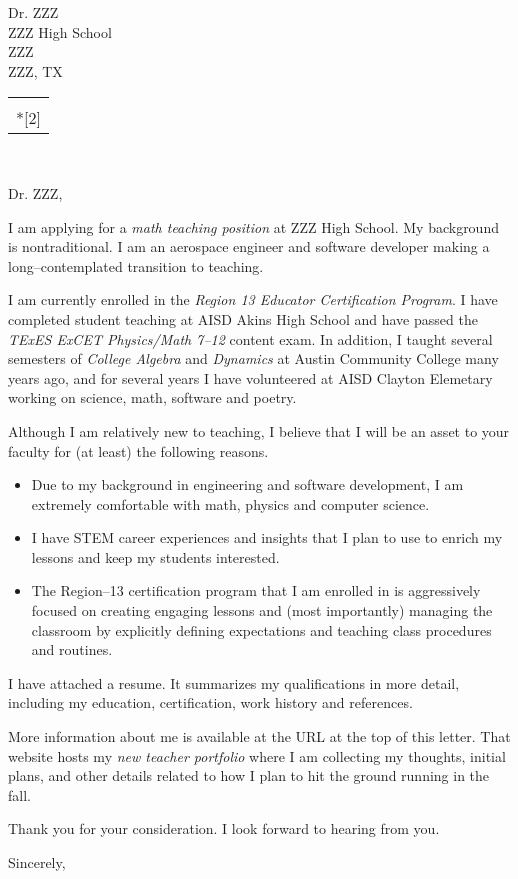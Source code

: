 \documentclass[12pt]{letter}
\makeatletter
\newcommand{\principalname}{Dr. ZZZ}
\newcommand{\schoolname}{ZZZ High School}
\newcommand{\schoolstreetaddress}{ZZZ}
\newcommand{\schoolcitystate}{ZZZ, TX}
\renewcommand*{\opening}[1]{\ifx\@empty\fromaddress
    \thispagestyle{firstpage}%
      {\raggedleft\@date\par}%
    \else  %
      \thispagestyle{empty}%
      {\raggedleft\begin{tabular}{l@{}}\ignorespaces
        \fromaddress \\*[2\parskip]%
        \end{tabular}\par
       \raggedright\@date\par}%
    \fi
    \vspace{2\parskip}%
    {\raggedright \toname \\ \toaddress \par}%
    \vspace{2\parskip}%
    #1\par\nobreak}
\makeatother
\begin{document}
  \selectfont
  \begin{letter}{\principalname\\ \schoolname \\ \schoolstreetaddress\\ \schoolcitystate}
  \opening{\principalname,}

  I am applying for a \textit{math teaching position} at \schoolname.
  My background is nontraditional.
  I am an aerospace engineer and software developer making a long--contemplated transition to teaching.

  I am currently enrolled in the
  \textit{Region 13 Educator Certification Program}.
  I have completed student teaching at AISD Akins High School
  and have passed the
  \textit{TExES ExCET Physics/Math 7--12} content exam.
  In addition, I taught several semesters of \textit{College Algebra} and \textit{Dynamics} 
  at Austin Community College many years ago,
  and for several years I have volunteered at AISD Clayton Elemetary
  working on science, math, software and poetry.

  Although I am relatively new to teaching,
  I believe that I will be an asset to your faculty for (at least) the following reasons.
  \begin{itemize}
    \item Due to my background in engineering and software development,
    I am extremely comfortable with math, physics and computer science.
    \item I have STEM career experiences and insights that I plan to use 
    to enrich my lessons and keep my students interested.
    \item The Region--13 certification program that I am enrolled in
    is aggressively focused on creating engaging lessons and (most importantly)
    managing the classroom by explicitly defining expectations and teaching
    class procedures and routines.
  \end{itemize}
    
    I have attached a resume.
    It summarizes my qualifications in more detail, including my
    education, certification, work history and references.

    More information about me is available 
    at the URL at the top of this letter. 
    That website hosts my 
    \textit{new teacher portfolio} where I am collecting my thoughts, initial plans, and 
    other details related to how I plan to hit the ground running in the fall.

    Thank you for your consideration.
    I look forward to hearing from you.

  \closing{Sincerely,}
  \end{letter}
  
\end{document}
